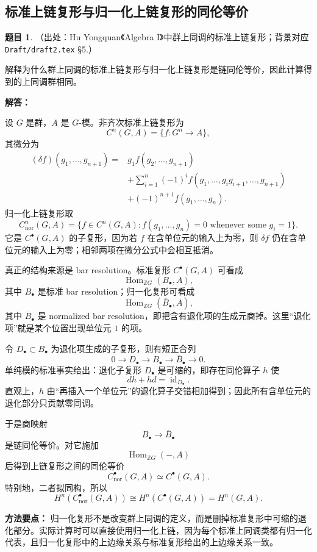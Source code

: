 \documentclass[a4paper]{ctexart}
\theoremstyle{definition}
\newtheorem{example}{题目}[section]
\theoremstyle{analysis}
\theoremstyle{plain}
\begin{document}
\subsection{标准上链复形与归一化上链复形的同伦等价}\label{subsec:problem-normalized-cochain-homotopy}

\begin{example}
（出处：Hu Yongquan《Algebra I》中群上同调的标准上链复形；背景对应 \texttt{Draft/draft2.tex} \S5.）

解释为什么群上同调的标准上链复形与归一化上链复形是链同伦等价，因此计算得到的上同调群相同。

\textbf{解答：}

设 \(G\) 是群，\(A\) 是 \(G\)-模。非齐次标准上链复形为
\[
  C^n(G,A)=\{f:G^n\to A\},
\]
其微分为
\[
\begin{aligned}
(\delta f)(g_1,\dots,g_{n+1})
={}&g_1f(g_2,\dots,g_{n+1})\\
&+\sum_{i=1}^{n}(-1)^if(g_1,\dots,g_ig_{i+1},\dots,g_{n+1})\\
&+(-1)^{n+1}f(g_1,\dots,g_n).
\end{aligned}
\]
归一化上链复形取
\[
  C^n_{\mathrm{nor}}(G,A)
  =
  \{f\in C^n(G,A): f(g_1,\dots,g_n)=0
  \text{ whenever some }g_i=1\}.
\]
它是 \(C^\bullet(G,A)\) 的子复形，因为若 \(f\) 在含单位元的输入上为零，则 \(\delta f\) 仍在含单位元的输入上为零；相邻两项在微分公式中会相互抵消。

真正的结构来源是 bar resolution。标准复形 \(C^\bullet(G,A)\) 可看成
\[
  \operatorname{Hom}_{\mathbb ZG}(B_\bullet,A),
\]
其中 \(B_\bullet\) 是标准 bar resolution；归一化复形可看成
\[
  \operatorname{Hom}_{\mathbb ZG}(\overline B_\bullet,A),
\]
其中 \(\overline B_\bullet\) 是 normalized bar resolution，即把含有退化项的生成元商掉。这里“退化项”就是某个位置出现单位元 \(1\) 的项。

令 \(D_\bullet\subset B_\bullet\) 为退化项生成的子复形，则有短正合列
\[
  0\longrightarrow D_\bullet
  \longrightarrow B_\bullet
  \longrightarrow \overline B_\bullet
  \longrightarrow 0.
\]
单纯模的标准事实给出：退化子复形 \(D_\bullet\) 是可缩的，即存在同伦算子 \(h\) 使
\[
  dh+hd=\operatorname{id}_{D_\bullet}.
\]
直观上，\(h\) 由“再插入一个单位元”的退化算子交错相加得到；因此所有含单位元的退化部分只贡献零同调。

于是商映射
\[
  B_\bullet\longrightarrow \overline B_\bullet
\]
是链同伦等价。对它施加
\[
  \operatorname{Hom}_{\mathbb ZG}(-,A)
\]
后得到上链复形之间的同伦等价
\[
  C^\bullet_{\mathrm{nor}}(G,A)
  \simeq
  C^\bullet(G,A).
\]
特别地，二者拟同构，所以
\[
  H^n(C^\bullet_{\mathrm{nor}}(G,A))
  \cong
  H^n(C^\bullet(G,A))
  =
  H^n(G,A).
\]

\textbf{方法要点：}
归一化复形不是改变群上同调的定义，而是删掉标准复形中可缩的退化部分。实际计算时可以直接使用归一化上链，因为每个标准上同调类都有归一化代表，且归一化复形中的上边缘关系与标准复形给出的上边缘关系一致。
\end{example}
\end{document}
